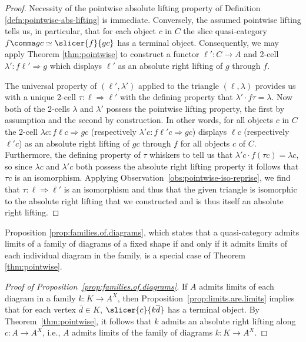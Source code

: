 \begin{proof}
Necessity of the pointwise absolute lifting property of Definition \ref{defn:pointwise-abs-lifting} is immediate. Conversely, the assumed pointwise lifting tells us, in particular, that for each object $c$ in $C$ the slice quasi-category $f\comma gc\simeq\slicer{f}{gc}$ has a terminal object. Consequently, we may apply Theorem \ref{thm:pointwise} to construct a functor $\ell'\colon C\to A$ and 2-cell $\lambda'\colon f\ell'\Rightarrow g$ which displays $\ell'$ as an absolute right lifting of $g$ through $f$. 
  
The universal property of $(\ell',\lambda')$ applied to the triangle $(\ell,\lambda)$ provides us with a unique 2-cell $\tau\colon\ell\Rightarrow\ell'$ with the defining property that $\lambda'\cdot f\tau =\lambda$. Now both of the 2-cells $\lambda$ and $\lambda'$ possess the pointwise lifting property, the first by assumption and the second by construction. In other words, for all objects $c$ in $C$ the 2-cell $\lambda c\colon f\ell c\Rightarrow g c$ (respectively $\lambda' c\colon f\ell' c\Rightarrow g c$) displays $\ell c$ (respectively $\ell' c$) as an absolute right lifting of $g c$ through $f$ for all objects $c$ of $C$. Furthermore, the defining property of $\tau$ whiskers to tell us that $\lambda' c\cdot f(\tau c)=\lambda c$, so since $\lambda c$ and $\lambda' c$ both possess the absolute right lifting property it follows that $\tau c$ is an isomorphism. Applying Observation~\ref{obs:pointwise-iso-reprise}, we find that $\tau\colon\ell\Rightarrow\ell'$ is an isomorphism and thus that the given triangle is isomorphic to the absolute right lifting that we constructed and is thus itself an absolute right lifting.
\end{proof}

Proposition \ref{prop:families.of.diagrams}, which states that a quasi-category admits limits of a family of diagrams of a fixed shape if and only if it admits limits of each individual diagram in the family, is a special case of Theorem \ref{thm:pointwise}.

\begin{proof}[Proof of Proposition~\ref{prop:families.of.diagrams}]
If $A$ admits limits of each diagram in a family $k \colon K \to A^X$, then Proposition~\ref{prop:limits.are.limits} implies that for each vertex $\overline{d} \in K$, $\slicer{c}{k\overline{d}}$ has a terminal object. By Theorem~\ref{thm:pointwise}, it follows that $k$ admits an absolute right lifting along $c \colon A \to A^X$, i.e., $A$ admits limits of the family of diagrams $k \colon K \to A^X$.
\end{proof}

